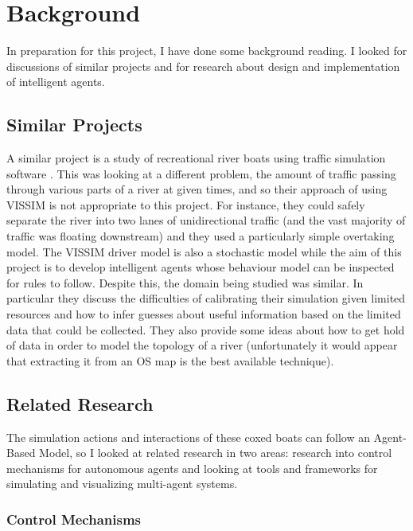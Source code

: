 \chapter{Background}

In preparation for this project, I have done some background
reading. I looked for discussions of similar projects and for research about design and implementation of intelligent agents. 

\section{Similar Projects}

A similar project is a study of recreational river boats using
traffic simulation software \cite{Lowry2011}. This was looking at a
different problem, the amount of traffic passing through various parts
of a river at given times, and so their approach of using VISSIM is
not appropriate to this project. For instance, they could safely
separate the river into two lanes of unidirectional traffic (and the
vast majority of traffic was floating downstream) and they used a
particularly simple overtaking model. The VISSIM driver model is also
a stochastic model while the aim of this project is to develop
intelligent agents whose behaviour model can be inspected for rules to
follow. Despite this, the domain being studied was
similar. In particular they discuss the difficulties of calibrating
their simulation given limited resources and how to infer guesses
about useful information based on the limited data that could be
collected. They also provide some ideas about how to get hold of data
in order to model the topology of a river (unfortunately it would
appear that extracting it from an OS map is the best available
technique).

\section{Related Research}

The simulation actions and interactions of these coxed boats can follow an Agent-Based Model, so I looked at related research in two areas: research into control mechanisms for
autonomous agents and looking at tools and frameworks for simulating
and visualizing multi-agent systems.

\subsection{Control Mechanisms}

